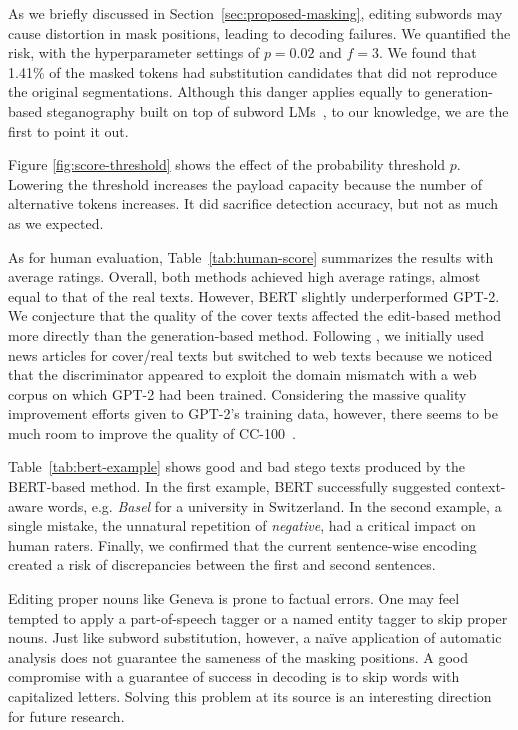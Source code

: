 \documentclass[11pt]{article}
\begin{document}
As we briefly discussed in Section~\ref{sec:proposed-masking}, editing subwords may cause distortion in mask positions, leading to decoding failures.
We quantified the risk, with the hyperparameter settings of $p = 0.02$ and $f = 3$.
We found that 1.41\% of the masked tokens had substitution candidates that did not reproduce the original segmentations.
Although this danger applies equally to generation-based steganography built on top of subword LMs~\citep{dai-cai-2019-towards,ziegler-etal-2019-neural,shen-etal-2020-near}, to our knowledge, we are the first to point it out.


Figure \ref{fig:score-threshold} shows the effect of the probability threshold $p$.
Lowering the threshold increases the payload capacity because the number of alternative tokens increases.
It did sacrifice detection accuracy, but not as much as we expected.


As for human evaluation, Table~\ref{tab:human-score} summarizes the results with average ratings.
Overall, both methods achieved high average ratings, almost equal to that of the real texts.
However, BERT slightly underperformed GPT-2.
We conjecture that the quality of the cover texts affected the edit-based method more directly than the generation-based method.
Following \citet{ziegler-etal-2019-neural}, we initially used news articles for cover/real texts but switched to web texts because we noticed that the discriminator appeared to exploit the domain mismatch with a web corpus on which GPT-2 had been trained.
Considering the massive quality improvement efforts given to GPT-2's training data, however, there seems to be much room to improve the quality of CC-100~\citep{wenzek-etal-2020-ccnet}.

Table~\ref{tab:bert-example} shows good and bad stego texts produced by the BERT-based method.
In the first example, BERT successfully suggested context-aware words, e.g. \textit{Basel} for a university in Switzerland.
In the second example, a single mistake, the unnatural repetition of \textit{negative}, had a critical impact on human raters.
Finally, we confirmed that the current sentence-wise encoding created a risk of discrepancies between the first and second sentences.

Editing proper nouns like Geneva is prone to factual errors.
One may feel tempted to apply a part-of-speech tagger or a named entity tagger to skip proper nouns.
Just like subword substitution, however, a na\"{i}ve application of automatic analysis does not guarantee the sameness of the masking positions.
A good compromise with a guarantee of success in decoding is to skip words with capitalized letters.
Solving this problem at its source is an interesting direction for future research.
\end{document}
